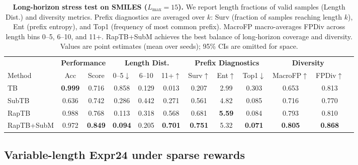 \documentclass{article}
\theoremstyle{plain}
\theoremstyle{definition}
\theoremstyle{remark}
\begin{document}
\begin{table}[!htbp]
\centering
\small
\setlength{\tabcolsep}{4.5pt}
\renewcommand{\arraystretch}{1.15}
\caption{\textbf{Long-horizon stress test on SMILES ($L_{\max}=15$).}
We report length fractions of valid samples (Length Dist.) and diversity metrics.
Prefix diagnostics are averaged over $k$: Surv (fraction of samples reaching length $k$), Ent (prefix entropy), and Top1 (frequency of most common prefix).
MacroFP macro-averages FPDiv across length bins 0--5, 6--10, and 11+.
RapTB+SubM achieves the best balance of long-horizon coverage and diversity.
Values are point estimates (mean over seeds); 95\% CIs are omitted for space.
}
\label{tab:smiles_L15_stress}
\vspace{-0.5em}
\begin{tabular}{@{}lccccccccccc@{}}
\toprule
& \multicolumn{2}{c}{\textbf{Performance}} & \multicolumn{3}{c}{\textbf{Length Dist.}} & \multicolumn{3}{c}{\textbf{Prefix Diagnostics}} & \multicolumn{2}{c}{\textbf{Diversity}} \\
\cmidrule(lr){2-3} \cmidrule(lr){4-6} \cmidrule(lr){7-9} \cmidrule(lr){10-11}
Method & Acc & Score & 0--5$\downarrow$ & 6--10 & 11+$\uparrow$ & Surv$\uparrow$ & Ent$\uparrow$ & Top1$\downarrow$ & MacroFP$\uparrow$ & FPDiv$\uparrow$ \\
\midrule
TB & \textbf{0.999} & 0.716 & 0.858 & 0.129 & 0.013 & 0.207 & 2.99 & 0.303 & 0.653 & 0.813 \\
SubTB & 0.636 & 0.742 & 0.286 & 0.442 & 0.271 & 0.561 & 4.82 & 0.085 & 0.716 & 0.770 \\
RapTB & 0.988 & 0.768 & 0.113 & 0.318 & 0.568 & 0.681 & \textbf{5.59} & 0.084 & 0.793 & 0.810 \\
RapTB+SubM & 0.972 & \textbf{0.849} & \textbf{0.094} & 0.205 & \textbf{0.701} & \textbf{0.751} & 5.32 & \textbf{0.071} & \textbf{0.805} & \textbf{0.868} \\
\bottomrule
\end{tabular}
\vspace{-0.5em}
\end{table}


\subsection{Variable-length Expr24 under sparse rewards}
\label{sec:expr24}
\end{document}
